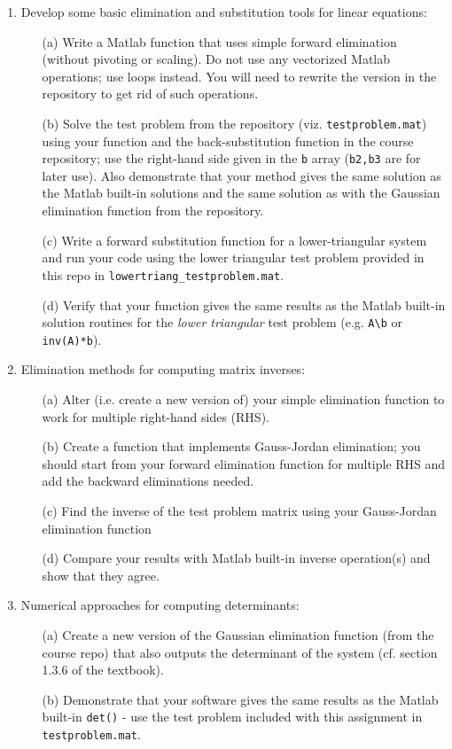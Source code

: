 \documentclass{article}
\begin{document}
\begin{enumerate}
  \item Develop some basic elimination and substitution tools for linear equations:   
  \begin{itemize}
    \item[(a)] Write a Matlab function that uses simple forward elimination (without pivoting or scaling).  Do not use any vectorized Matlab operations; use loops instead.  You will need to rewrite the version in the repository to get rid of such operations.  
    \item[(b)] Solve the test problem from the repository (viz. \texttt{testproblem.mat}) using your function and the back-substitution function in the course repository; use the right-hand side given in the \texttt{b} array (\texttt{b2,b3} are for later use).   Also demonstrate that your method gives the same solution as the Matlab built-in solutions and the same solution as with the Gaussian elimination function from the repository. 
    \item[(c)] Write a forward substitution function for a lower-triangular system and run your code using the lower triangular test problem provided in this repo in \texttt{lowertriang\_testproblem.mat}.  
    \item[(d)] Verify that your function gives the same results as the Matlab built-in solution routines for the \emph{lower triangular} test problem (e.g. \texttt{A\textbackslash b} or \texttt{inv(A)*b}).  
  \end{itemize}
  
  \item Elimination methods for computing matrix inverses:  
  \begin{itemize}
    \item[(a)] Alter (i.e. create a new version of) your simple elimination function to work for multiple right-hand sides (RHS).  
    \item[(b)] Create a function that implements Gauss-Jordan elimination; you should start from your forward elimination function for multiple RHS and add the backward eliminations needed.  
    \item[(c)] Find the inverse of the test problem matrix using your Gauss-Jordan elimination function
    \item[(d)] Compare your results with Matlab built-in inverse operation(s) and show that they agree.
  \end{itemize}

  \item Numerical approaches for computing determinants:  
  \begin{itemize}
    \item[(a)] Create a new version of the Gaussian elimination function (from the course repo) that also outputs the determinant of the system (cf. section 1.3.6 of the textbook).  
    \item[(b)] Demonstrate that your software gives the same results as the Matlab built-in \texttt{det()} - use the test problem included with this assignment in \texttt{testproblem.mat}.  
    
  \end{itemize}
\end{enumerate}
\end{document}
